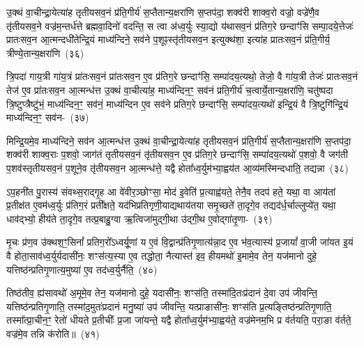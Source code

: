 उ॒क्थं वा॒चीन्द्रा॒येत्या॑ह तृतीय\-सव॒नं प्र॑ति॒गीर्य॑ स॒प्तैतान्य॒क्षरा॑णि स॒प्तप॑दा॒ शक्व॑री शाक्व॒रो वज्रो॒ वज्रे॑णै॒व तृ॑तीय\-सव॒ने वज्र॑म॒न्तर्ध॑त्ते ब्रह्मवा॒दिनो॑ वदन्ति॒ स त्वा अ॑ध्व॒र्युः स्या॒द्यो य॑थासव॒नं प्र॑तिग॒रे छन्दाꣳ॑सि सम्पा॒दये॒त्तेजः॑ प्रातःसव॒न आ॒त्मन्दधी॑तेन्द्रि॒यं माध्य॑न्दिने॒ सव॑ने प॒शूꣴस्तृ॑तीय\-सव॒न इत्युक्थ॑शा॒ इत्या॑ह प्रातःसव॒नं प्र॑ति॒गीर्य॒ त्रीण्ये॒तान्य॒क्षरा॑णि~(३६)\ip

त्रि॒पदा॑ गाय॒त्री गा॑य॒त्रं प्रा॑तःसव॒नं प्रा॑तःसव॒न ए॒व प्र॑तिग॒रे छन्दाꣳ॑सि॒ सम्पा॑दय॒त्यथो॒ तेजो॒ वै गा॑य॒त्री तेजः॑ प्रातःसव॒नं तेज॑ ए॒व प्रा॑तःसव॒न आ॒त्मन्ध॑त्त उ॒क्थं वा॒चीत्या॑ह॒ माध्य॑न्दिन॒ꣳ॒ सव॑नं प्रति॒गीर्य॑ च॒त्वार्ये॒तान्य॒क्षरा॑णि॒ चतु॑ष्पदा त्रि॒ष्टुप्त्रैष्टु॑भं॒ माध्य॑न्दिन॒ꣳ॒ सव॑नं॒ माध्य॑न्दिन ए॒व सव॑ने प्रतिग॒रे छन्दाꣳ॑सि॒ सम्पा॑दय॒त्यथो॑ इन्द्रि॒यं वै त्रि॒ष्टुगि॑न्द्रि॒यं माध्य॑न्दिन॒ꣳ॒ सव॑न-~(३७)\ip

मिन्द्रि॒यमे॒व माध्य॑न्दिने॒ सव॑न आ॒त्मन्ध॑त्त उ॒क्थं वा॒चीन्द्रा॒येत्या॑ह तृतीय\-सव॒नं प्र॑ति॒गीर्य॑ स॒प्तैतान्य॒क्षरा॑णि स॒प्तप॑दा॒ शक्व॑री शाक्व॒राः प॒शवो॒ जाग॑तं तृतीय\-सव॒नं तृ॑तीय\-सव॒न ए॒व प्र॑तिग॒रे छन्दाꣳ॑सि॒ सम्पा॑दय॒त्यथो॑ प॒शवो॒ वै जग॑ती प॒शव॑स्तृतीय\-सव॒नं प॒शूने॒व तृ॑तीय\-सव॒न आ॒त्मन्ध॑त्ते॒ यद्वै होता᳚ध्व॒र्युम॑भ्या॒ह्वय॑त आ॒व्य॑मस्मिन्दधाति॒ तद्यन्ना~(३८)\ip

ऽप॒हनी॑त पु॒रास्य॑ संवथ्स॒राद्गृ॒ह आ वे॑वीर॒ञ्छोꣳसा॒ मोद॑ इ॒वेति॑ प्र॒त्याह्व॑यते॒ तेनै॒व तदप॑ हते॒ यथा॒ वा आय॑तां प्र॒तीक्ष॑त ए॒वम॑ध्व॒र्युः प्र॑तिग॒रं प्रती᳚क्षते॒ यद॑भिप्रतिगृणी॒याद्यथाय॑तया समृ॒च्छते॑ ता॒दृगे॒व तद्यद॑र्ध॒र्चाल्लुप्ये॑त॒ यथा॒ धाव॑द्भ्यो॒ हीय॑ते ता॒दृगे॒व तत्प्र॒बाहु॒ग्वा ऋ॒त्विजा॑मुद्गी॒था उ॑द्गी॒थ ए॒वोद्गा॑तृ॒णा-~(३९)\ip

मृ॒चः प्र॑ण॒व उ॑क्थश॒ꣳ॒सिनां᳚ प्रतिग॒रो᳚\-ऽध्वर्यू॒णां य ए॒वं वि॒द्वान्प्र॑तिगृ॒णात्य॑न्ना॒द ए॒व भ॑व॒त्यास्य॑ प्र॒जायां᳚ वा॒जी जा॑यत इ॒यं वै होता॒साव॑ध्व॒र्युर्यदासी॑नः॒ शꣳस॑त्य॒स्या ए॒व तद्धोता॒ नैत्यास्त॑ इव॒ हीयमथो॑ इ॒मामे॒व तेन॒ यज॑मानो दुहे॒ यत्तिष्ठ॑न्प्रतिगृ॒णात्य॒मुष्या॑ ए॒व तद॑ध्व॒र्युर्नैति॒~(४०)\ip

तिष्ठ॑तीव॒ ह्य॑सावथो॑ अ॒मूमे॒व तेन॒ यज॑मानो दुहे॒ यदासी॑नः॒ शꣳस॑ति॒ तस्मा॑दि॒तःप्र॑दानं दे॒वा उप॑ जीवन्ति॒ यत्तिष्ठ॑न्प्रतिगृ॒णाति॒ तस्मा॑द॒मुतः॑प्रदानं मनु॒ष्या॑ उप॑ जीवन्ति॒ यत्प्राङासी॑नः॒ शꣳस॑ति प्र॒त्यङ्तिष्ठ॑न्प्रतिगृ॒णाति॒ तस्मा᳚त्प्रा॒चीन॒ꣳ॒ रेतो॑ धीयते प्र॒तीचीः᳚ प्र॒जा जा॑यन्ते॒ यद्वै होता᳚ध्व॒र्युम॑भ्या॒ह्वय॑ते॒ वज्र॑मेनम॒भि प्र व॑र्तयति॒ परा॒ङा व॑र्तते॒ वज्र॑मे॒व तन्नि क॑रोति॥~(४१)\ip

{\anuvakamend[{सव॑ने॒ वज्र॑म॒न्तर्ध॑त्ते॒ त्रीण्ये॒तान्य॒क्षरा॑णीन्द्रि॒यं माध्य॑न्दिन॒ꣳ॒ सव॑न॒न्नोद्गा॑तृ॒णाम॑ध्व॒र्युर्नैति॑ वर्तयत्य॒ष्टौ च॑}]}

